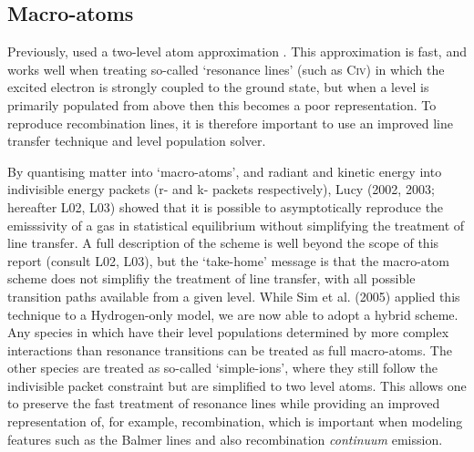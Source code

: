 \documentclass[useAMS,usenatbib,onecolumn]{mn2e2}
\begin{document}
\subsection{Macro-atoms}

Previously, \py used a two-level atom approximation \cite[see e.g.][]{mihalas}. This approximation is 
fast, and works well when treating so-called `resonance lines' (such as C\textsc{iv}) 
in which the excited electron is strongly coupled to the ground state, but when a level is primarily populated from above then this becomes a poor representation. To reproduce recombination lines, it is therefore
important to use an improved line transfer technique and level population solver.

By quantising matter into `macro-atoms', and radiant and kinetic energy into indivisible energy packets (r- and k- packets respectively), 
Lucy (2002, 2003\nocite{lucy2002, lucy2003}; hereafter L02, L03) showed that it is possible 
to asymptotically reproduce the emisssivity of a gas in statistical equilibrium 
without simplifying the treatment of line transfer. A full description of the scheme 
is well beyond the scope of this report (consult L02, L03), but the `take-home' message is
that the macro-atom scheme does not simplifiy the treatment of line transfer,
with all possible transition paths available from a given level.
While Sim et al. (2005) applied this technique to
a Hydrogen-only model, we are now able to adopt a hybrid scheme. 
Any species in which have their level populations determined by
more complex interactions than resonance transitions
can be treated as full macro-atoms. The other species are treated as so-called `simple-ions',
where they still follow the indivisible packet constraint but are simplified to two level atoms.
This allows one to preserve the fast treatment of resonance lines while providing 
an improved representation of, for example, recombination, which is important when modeling features 
such as the Balmer lines and also recombination {\sl continuum} emission. 

\end{document}
